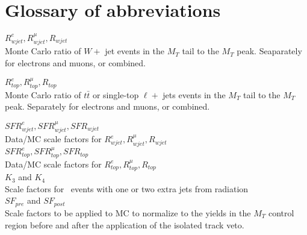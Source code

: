 \section{Glossary of abbreviations}

$R^{e}_{wjet}, R^{\mu}_{wjet}, R_{wjet}$ \\
Monte Carlo ratio of $W +$ jet events in the $M_T$ tail to the $M_T$ peak.
Seaparately for electrons and muons, or combined.

$R^{e}_{top}, R^{\mu}_{top}, R_{top}$ \\
Monte Carlo ratio of $t\bar{t}$ or single-top $\ell +$ jets events in the $M_T$ tail to the $M_T$ peak.
Separately for electrons and muons, or combined.

$SFR^{e}_{wjet}, SFR^{\mu}_{wjet}, SFR_{wjet}$ \\
Data/MC scale factors for $R^{e}_{wjet}, R^{\mu}_{wjet}, R_{wjet}$ \\

$SFR^{e}_{top}, SFR^{\mu}_{top}, SFR_{top}$ \\
Data/MC scale factors for $R^{e}_{top}, R^{\mu}_{top}, R_{top} $\\

$K_3$ and $K_4$ \\
Scale factors for \ttdil\ events with one or two extra jets from
radiation \\

$SF_{pre}$ and $SF_{post}$ \\
Scale factors to be applied to MC to normalize to the yields in the 
$M_T$ control region before and after the application of the isolated
track veto.


